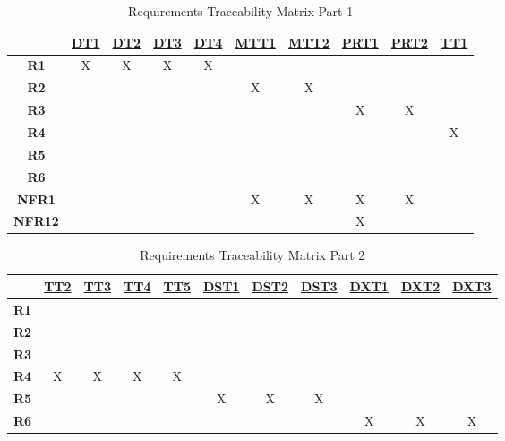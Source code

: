 \documentclass[12pt, titlepage]{article}
\begin{document}
\noindent
\begin{table}[H]
	\centering
	\begin{tabular}{|c|c|c|c|c|c|c|c|c|c|}
	\hline
		& \hyperref[DT1]{DT1}& \hyperref[DT2]{DT2}&\hyperref[DT3]{DT3}& \hyperref[DT4]{DT4} &\hyperref[MTT1]{MTT1}&\hyperref[MTT2]{MTT2}&\hyperref[PRT1]{PRT1}&\hyperref[PRT2]{PRT2}&\hyperref[TT1]{TT1} \\
	\hline       
	\textbf{R1}         &X&X&X&X&&&&& \\ \hline
	\textbf{R2}         &&&&&X&X&&&\\ \hline
	\textbf{R3}         &&&&&&&X&X& \\ \hline
	\textbf{R4}         &&&&&&&&&X\\ \hline
	\textbf{R5}         &&&&&&&&& \\ \hline
	\textbf{R6}         &&&&&&&&&\\ \hline
	\textbf{NFR1}     &&&&&X&X&X&X& \\ \hline
	\textbf{NFR12}   &&&&&&&X&&\\ \hline
	\hline
	\end{tabular}
	\caption{ Requirements Traceability Matrix Part 1}
	\label{Table:A_trace}
\end{table}



\begin{table}[H]
	\centering
	\begin{tabular}{|c|c|c|c|c|c|c|c|c|c|c|}
	\hline
	& \hyperref[TT2]{TT2}&\hyperref[TT3]{TT3}& \hyperref[TT4]{TT4} &\hyperref[TT5]{TT5}&\hyperref[DST1]{DST1}&\hyperref[DST2]{DST2}&\hyperref[DST3]{DST3}&\hyperref[DXT1]{DXT1}&\hyperref[DXT2]{DXT2}&\hyperref[DXT3]{DXT3} \\
	\hline     
	\textbf{R1}         &&&&&&&&&& \\ \hline
	\textbf{R2}       	 &&&&&&&&&&\\ \hline
	\textbf{R3}         &&&&&&&&&& \\ \hline
	\textbf{R4}         &X&X&X&X&&&&&&\\ \hline
	\textbf{R5}          &&&&&X&X&X&&& \\ \hline
	\textbf{R6}         &&&&&&&&X&X&X\\ \hline
	\hline
	\end{tabular}
	\caption{Requirements Traceability Matrix Part 2}
	\label{Table:B_trace}
\end{table}
\end{document}
